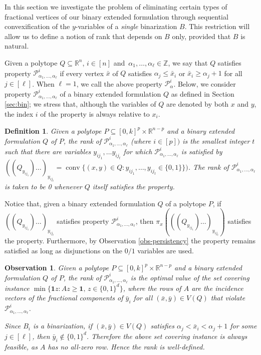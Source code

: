 \documentclass[11pt,a4paper]{article}
\newtheorem{definition}[theorem]{Definition}
\newtheorem{observation}[theorem]{Observation}
\newcommand{\R}{\mathbb{R}}
\newcommand{\conv}{\operatorname{conv}}
\newcommand{\Z}{\mathbb{Z}}
\newcommand{\1}{\textbf{1}}
\begin{document}
In this section we investigate the problem of eliminating certain types of fractional vertices of our binary extended formulation through sequential convexification of the $y$-variables of a \emph{single} binarization $B$. This restriction will allow us to define a notion of rank that depends on $B$ only, provided that $B$ is natural.


 Given a polytope $Q\subseteq \R^n$,  $i\in [n]$ and $\,\alpha_1,\dots,\alpha_{\ell} \in \Z$, we 
   say that $Q$ satisfies property $\mathcal{P}^i_{\alpha_1,\dots,\alpha_{\ell}}$  if 
   every vertex $\bar{x}$ of $Q$ satisfies $\alpha_j\le \bar{x}_i$ or $\bar{x}_i\ge \alpha_j+1$ for all $j\in[\ell]$. When $\ell=1$, we call the above property $\mathcal{P}^i_{\alpha}$. Below, we consider property $\mathcal{P}^i_{\alpha_1,\dots,\alpha_{\ell}}$ of a binary extended formulation $Q$ as defined in Section \ref{sec:bin}; we stress that, although the variables of $Q$ are denoted by both $x$ and $y$, the index $i$ of the property is always relative to $x_i$.
   
  

\begin{definition}\label{def-rank} Given a  polytope $P\subseteq [0,k]^p\times \R^{n-p}$ and a binary extended formulation $Q$ of  $P$,
the {\em rank} of  $\mathcal{P}^i_{\alpha_1,\dots,\alpha_{\ell}}$ (where $i\in[p])$  is the smallest integer $t$ such that there are variables $y_{ij_1},\dots y_{ij_t}$ for which $\mathcal{P}^i_{\alpha_1,\dots,\alpha_{\ell}}$ is satisfied by $((Q_{y_{ij_1}})\dots)_{y_{ij_t}}=\conv \{(x,y)\in Q: y_{ij_1},\dots, y_{ij_t}\in \{0,1\}\})$.
The rank of  $\mathcal{P}^i_{\alpha_1,\dots,\alpha_{\ell}}$ is taken to be 0 whenever $Q$ itself satisfies the property. \end{definition}

Notice that, given a binary extended formulation $Q$ of a  polytope $P$, if $((Q_{y_{ij_1}})\dots)_{y_{ij_t}}$  satisfies property
 $\mathcal{P}^i_{\alpha_1,\dots,\alpha_{\ell}}$, then $\pi_x(((Q_{y_{ij_1}})\dots)_{y_{ij_t}})$ satisfies the property. Furthermore, by Observation \ref{obs-persistency} the property remains satisfied as long as disjunctions on the $0/1$ variables are used.


\begin{observation}\label{obs:rank}  Given a  polytope $P\subseteq [0,k]^p\times \R^{n-p}$ and a binary extended formulation $Q$ of  $P$, the rank  of $\mathcal{P}^i_{\alpha_1,\dots,\alpha_{\ell}}$ is the optimal value of the set covering instance
$\min\{ \mathbf {1}z:Az\ge \mathbf{1},\, z\in \{0,1\}^d\}$,
where the rows of $A$ are the incidence vectors of the fractional components of $\bar y_i$ for all $(\bar x,\bar y)\in V(Q)$ that violate  $\mathcal{P}^i_{\alpha_1,\dots,\alpha_{\ell}}$. 

Since $B_i$ is a binarization, if $(\bar{x},\bar{y})\in V(Q)$ satisfies $\alpha_j<\bar{x}_i<\alpha_j+1$ for some $j\in[\ell]$, then $\bar y_i\not\in\{0,1\}^d$. Therefore the above set covering instance is always feasible, as $A$ has no all-zero row. Hence the rank is well-defined.
\end{observation}
\end{document}
